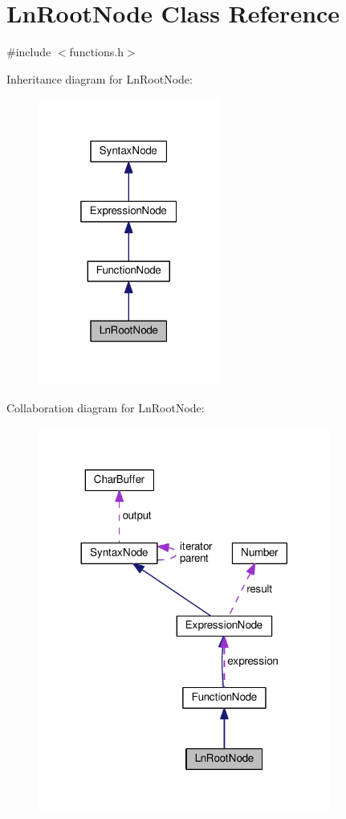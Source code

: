 \hypertarget{classLnRootNode}{}\section{Ln\+Root\+Node Class Reference}
\label{classLnRootNode}


{\ttfamily \#include $<$functions.\+h$>$}



Inheritance diagram for Ln\+Root\+Node\+:\nopagebreak
\begin{figure}[H]
\begin{center}
\leavevmode
\includegraphics[width=169pt]{classLnRootNode__inherit__graph}
\end{center}
\end{figure}


Collaboration diagram for Ln\+Root\+Node\+:\nopagebreak
\begin{figure}[H]
\begin{center}
\leavevmode
\includegraphics[width=272pt]{classLnRootNode__coll__graph}
\end{center}
\end{figure}
